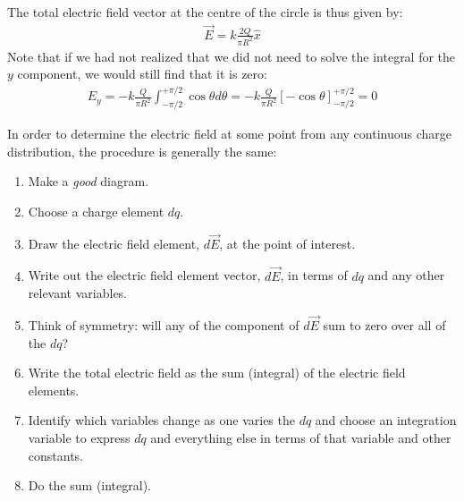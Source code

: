 The total electric field vector at the centre of the circle is thus given by:
\begin{align*}
\vec E = k\frac{2Q}{\pi R^2} \hat x
\end{align*}
Note that if we had not realized that we did not need to solve the integral for the $y$ component, we would still find that it is zero:
\begin{align*}
E_y= -k\frac{Q}{\pi R^2}\int_{-\pi/2}^{+\pi/2}\cos\theta d\theta=-k\frac{Q}{\pi R^2}\left[ -\cos\theta \right]_{-\pi/2}^{+\pi/2}=0
\end{align*}

In order to determine the electric field at some point from any continuous charge distribution, the procedure is generally the same:
\begin{enumerate}
\item Make a \textit{good} diagram.
\item Choose a charge element $dq$.
\item Draw the electric field element, $d\vec E$, at the point of interest.
\item Write out the electric field element vector, $d\vec E$, in terms of $dq$ and any other relevant variables.
\item Think of symmetry: will any of the component of $d\vec E$ sum to zero over all of the $dq$?
\item Write the total electric field as the sum (integral) of the electric field elements.
\item Identify which variables change as one varies the $dq$ and choose an integration variable to express $dq$ and everything else in terms of that variable and other constants.
\item Do the sum (integral).
\end{enumerate}

